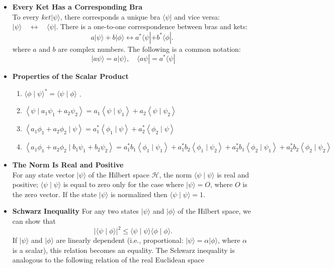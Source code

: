 \begin{itemize}
	\item \textbf{ Every Ket Has a Corresponding Bra}\\
	To every $k e t|\psi\rangle$, there corresponds a unique bra $\langle\psi|$ and vice versa:
	$|\psi\rangle \quad \longleftrightarrow \quad\langle\psi|$.
	There is a one-to-one correspondence between bras and kets:
	$$
	a|\psi\rangle+b|\phi\rangle \longleftrightarrow a^{*}\langle\psi|+b^{*}\langle\phi| \text {. }
	$$
	where $a$ and $b$ are complex numbers. The following is a common notation:
	$$
	|a \psi\rangle=a|\psi\rangle, \quad\langle a \psi|=a^{*}\langle\psi| 
	$$
	\item \textbf{Properties of the Scalar Product}
	\begin{enumerate}
		\item $\langle\phi \mid \psi\rangle^{*}=\langle\psi \mid \phi\rangle $ .
		\item $\left\langle\psi \mid a_{1} \psi_{1}+a_{2} \psi_{2}\right\rangle= a_{1}\left\langle\psi \mid \psi_{1}\right\rangle+a_{2}\left\langle\psi \mid \psi_{2}\right\rangle $
		\item $\left\langle a_{1} \phi_{1}+a_{2} \phi_{2} \mid \psi\right\rangle= a_{1}^{*}\left\langle\phi_{1} \mid \psi\right\rangle+a_{2}^{*}\left\langle\phi_{2} \mid \psi\right\rangle $
		\item $\left\langle a_{1} \phi_{1}+a_{2} \phi_{2} \mid b_{1} \psi_{1}+b_{2} \psi_{2}\right\rangle= a_{1}^{*} b_{1}\left\langle\phi_{1} \mid \psi_{1}\right\rangle+a_{1}^{*} b_{2}\left\langle\phi_{1} \mid \psi_{2}\right\rangle 
		+a_{2}^{*} b_{1}\left\langle\phi_{2} \mid \psi_{1}\right\rangle+a_{2}^{*} b_{2}\left\langle\phi_{2} \mid \psi_{2}\right\rangle$ 
	\end{enumerate}
\item \textbf{ The Norm Is Real and Positive}\\
For any state vector $|\psi\rangle$ of the Hilbert space $\mathcal{H}$, the norm $\langle\psi \mid \psi\rangle$ is real and positive; $\langle\psi \mid \psi\rangle$ is equal to zero only for the case where $|\psi\rangle=O$, where $O$ is the zero vector. If the state $|\psi\rangle$ is normalized then $\langle\psi \mid \psi\rangle=1$.
\item \textbf{Schwarz Inequality}
For any two states $|\psi\rangle$ and $|\phi\rangle$ of the Hilbert space, we can show that
$$
|\langle\psi \mid \phi\rangle|^{2} \leq\langle\psi \mid \psi\rangle\langle\phi \mid \phi\rangle .
$$
If $|\psi\rangle$ and $|\phi\rangle$ are linearly dependent (i.e., proportional: $|\psi\rangle=\alpha|\phi\rangle$, where $\alpha$ is a scalar), this relation becomes an equality. The Schwarz inequality  is analogous to the following relation of the real Euclidean space

\end{itemize}
